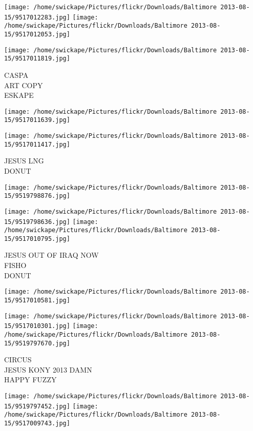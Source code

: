 \documentclass[10pt,letterpaper]{article}
\begin{document}
\texttt{[image: /home/swickape/Pictures/flickr/Downloads/Baltimore 2013-08-15/9517012283.jpg]}
\texttt{[image: /home/swickape/Pictures/flickr/Downloads/Baltimore 2013-08-15/9517012053.jpg]}

\texttt{[image: /home/swickape/Pictures/flickr/Downloads/Baltimore 2013-08-15/9517011819.jpg]}

CASPA\\
ART COPY\\
ESKAPE
\pagebreak

\texttt{[image: /home/swickape/Pictures/flickr/Downloads/Baltimore 2013-08-15/9517011639.jpg]}

\vspace{0.25in}
\texttt{[image: /home/swickape/Pictures/flickr/Downloads/Baltimore 2013-08-15/9517011417.jpg]}

JESUS LNG\\
DONUT
\pagebreak

\texttt{[image: /home/swickape/Pictures/flickr/Downloads/Baltimore 2013-08-15/9519798876.jpg]}

\vspace{0.25in}
\texttt{[image: /home/swickape/Pictures/flickr/Downloads/Baltimore 2013-08-15/9519798636.jpg]}
\texttt{[image: /home/swickape/Pictures/flickr/Downloads/Baltimore 2013-08-15/9517010795.jpg]}

JESUS OUT OF IRAQ NOW\\
FISHO\\
DONUT
\pagebreak

\texttt{[image: /home/swickape/Pictures/flickr/Downloads/Baltimore 2013-08-15/9517010581.jpg]}

\vspace{0.25in}
\texttt{[image: /home/swickape/Pictures/flickr/Downloads/Baltimore 2013-08-15/9517010301.jpg]}
\texttt{[image: /home/swickape/Pictures/flickr/Downloads/Baltimore 2013-08-15/9519797670.jpg]}

CIRCUS\\
JESUS KONY 2013 DAMN\\
HAPPY FUZZY
\pagebreak

\texttt{[image: /home/swickape/Pictures/flickr/Downloads/Baltimore 2013-08-15/9519797452.jpg]}
\texttt{[image: /home/swickape/Pictures/flickr/Downloads/Baltimore 2013-08-15/9517009743.jpg]}
\end{document}
